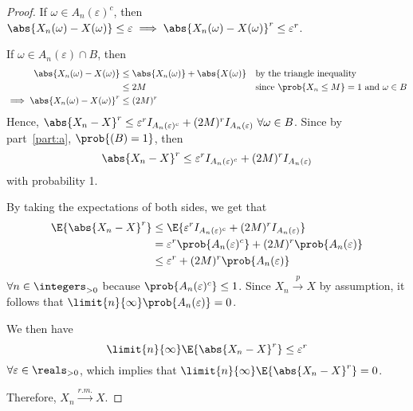 \documentclass[%
  hwnumber=8,%
  studentnumber=20053722,%
  {name=Bryan Hoang}%
]{%
  mthe353answer%
}
\begin{document}
\begin{questions}
\begin{parts}
\begin{solution}
\begin{proof}
          If \(\omega \in A_n(\varepsilon)^c\), then \(\abs{X_n(\omega)-X(\omega)}\le \varepsilon
          \implies \abs{X_n(\omega)-X(\omega)}^r \le \varepsilon^r\).

          If \(\omega \in A_n(\varepsilon) \cap B\), then
          \begin{align*}
            \abs{X_n(\omega)-X(\omega)} &\le \abs{X_n(\omega)} + \abs{X(\omega)}
              && \text{by the triangle inequality}\\
            &\le 2M && \text{since \(\prob{X_n \le M} = 1\) and \(\omega \in B\)}\\
            \implies \abs{X_n(\omega)-X(\omega)}^r &\le (2M)^r
          \end{align*}
          Hence, \(\abs{X_n-X}^r \le \varepsilon^r I_{A_n(\varepsilon)^c} +
          (2M)^r I_{A_n(\varepsilon)}\ \forall \omega \in B\). Since by part~\ref{part:a},
          \(\prob{(B) = 1}\), then
          \begin{equation*}
            \abs{X_n-X}^r \le \varepsilon^r I_{A_n(\varepsilon)^c} + (2M)^r I_{A_n(\varepsilon)}
          \end{equation*}
          with probability 1.

          By taking the expectations of both sides, we get that
          \begin{align*}
            \E{\abs{X_n-X}^r} &\le \E{\varepsilon^r I_{A_n(\varepsilon)^c} + (2M)^r I_{A_n(\varepsilon)}}\\
            &= \varepsilon^r \prob{A_n(\varepsilon)^c} + (2M)^r \prob{A_n(\varepsilon)}\\
            &\le \varepsilon^r + (2M)^r \prob{A_n(\varepsilon)}
          \end{align*}
          \(\forall n \in \integers_{>0}\) because \(\prob{A_n(\varepsilon)^c} \le 1\). Since \(X_n \xrightarrow{p} X\)
          by assumption, it follows that \(\limit{n}{\infty} \prob{A_n(\varepsilon)} = 0\).

          We then have
          \begin{equation*}
            \limit{n}{\infty} \E{\abs{X_n-X}^r} \le \varepsilon^r
          \end{equation*}
          \(\forall \varepsilon \in \reals_{>0}\), which implies that
          \(\limit{n}{\infty} \E{\abs{X_n-X}^r} = 0\).

          Therefore, \(X_n \xrightarrow{r.m.} X\).
        \end{proof}
      \end{solution}
    \end{parts}
  \end{questions}
\end{document}
